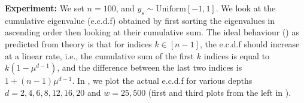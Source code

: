 \textbf{Experiment:} We set $n=100$, and $y_s\sim\text{Uniform}[-1,1]$. We look at the cumulative eigenvalue (e.c.d.f) obtained by first sorting the eigenvalues in ascending order then looking at their cumulative sum. The ideal behaviour () as predicted from theory is that for indices $k\in[n-1]$, the e.c.d.f should increase at a linear rate, i.e., the cumulative sum of the first $k$ indices is equal to $k(1-\mu^{d-1})$, and the difference between the last two indices is $1+(n-1)\mu^{d-1}$. In , we plot the actual e.c.d.f for various depths $d=2,4,6,8,12,16,20$ and $w=25,500$ (first and third plots from the left in ). 

